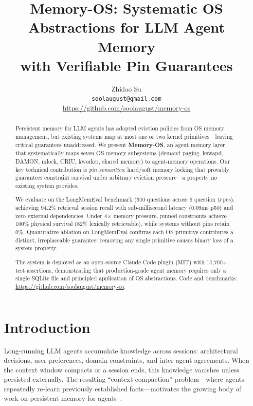 \documentclass[10pt,twocolumn]{article}
\title{\textbf{Memory-OS: Systematic OS Abstractions for LLM Agent Memory\\with Verifiable Pin Guarantees}}
\author{
  Zhidao Su \\
  \texttt{soolaugust@gmail.com} \\
  \url{https://github.com/soolaugust/memory-os}
}
\date{}
\begin{document}
\maketitle

\begin{abstract}
Persistent memory for LLM agents has adopted eviction policies from OS memory management, but existing systems map at most one or two kernel primitives---leaving critical guarantees unaddressed. We present \textbf{Memory-OS}, an agent memory layer that systematically maps seven OS memory subsystems (demand paging, kswapd, DAMON, mlock, CRIU, kworker, shared memory) to agent-memory operations. Our key technical contribution is \emph{pin semantics}: hard/soft memory locking that provably guarantees constraint survival under arbitrary eviction pressure---a property no existing system provides.

We evaluate on the LongMemEval benchmark (500 questions across 6 question types), achieving 94.2\% retrieval session recall with sub-millisecond latency (0.09ms p50) and zero external dependencies. Under 4$\times$ memory pressure, pinned constraints achieve 100\% physical survival (82\% lexically retrievable), while systems without pins retain 0\%. Quantitative ablation on LongMemEval confirms each OS primitive contributes a distinct, irreplaceable guarantee: removing any single primitive causes binary loss of a system property.

The system is deployed as an open-source Claude Code plugin (MIT) with 10{,}700+ test assertions, demonstrating that production-grade agent memory requires only a single SQLite file and principled application of OS abstractions. Code and benchmarks: \url{https://github.com/soolaugust/memory-os}.
\end{abstract}

\section{Introduction}
\label{sec:intro}

Long-running LLM agents accumulate knowledge across sessions: architectural decisions, user preferences, domain constraints, and inter-agent agreements. When the context window compacts or a session ends, this knowledge vanishes unless persisted externally. The resulting ``context compaction'' problem---where agents repeatedly re-learn previously established facts---motivates the growing body of work on persistent memory for agents~\cite{longmemeval2024,memgpt2023}.
\end{document}
